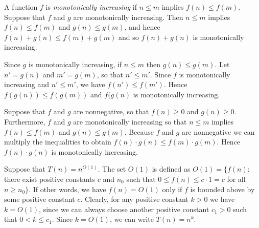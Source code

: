 \documentclass[a4paper,12pt]{article}
\begin{document}

A function $f$ is \textit{monotonically increasing} if $n \le m$ implies $f(n) \le f(m)$. Suppose that $f$ and $g$ are monotonically increasing. Then $n \le m$ implies $f(n) \le f(m)$ and $g(n) \le g(m)$, and hence $f(n) + g(n) \le f(m) + g(m)$ and so $f(n) + g(n)$ is monotonically increasing. 

Since $g$ is monotonically increasing, if $n \le m$ then $g(n) \le g(m)$. Let $n'=g(n)$ and $m'=g(m)$, so that $n' \le m'$. Since $f$ is monotonically increasing and $n' \le m'$, we have $f(n') \le f(m')$. Hence $f(g(n)) \le f(g(m))$ and $f(g(n)$ is monotonically increasing. 

Suppose that $f$ and $g$ are nonnegative, so that $f(n) \ge 0$ and $g(n) \ge 0$. Furthermore, $f$ and $g$ are monotonically increasing so that $n \le m$ implies $f(n) \le f(m)$ and $g(n) \le g(m)$. Because $f$ and $g$ are nonnegative we can multiply the inequalities to obtain $f(n) \cdot g(n) \le f(m) \cdot g(m)$. Hence $f(n) \cdot g(n)$ is monotonically increasing. 

\vspace{2mm}

Suppose that $T(n) = n^{O(1)}$. The set $O(1)$ is defined as $O(1) = \{ f(n) :$ there exist positive constants $c$ and $n_0$ such that $0 \le f(n) \le c \cdot 1 = c$ for all $n \ge n_0$$\}$. If other words, we have $f(n) = O(1)$ only if $f$ is bounded above by some positive constant $c$. Clearly, for any positive constant $k >0$ we have $k = O(1)$, since we can always choose another positive constant $c_1>0$ such that $0 < k \le c_1$. Since $k = O(1)$, we can write $T(n) = n^k$.
\end{document}
